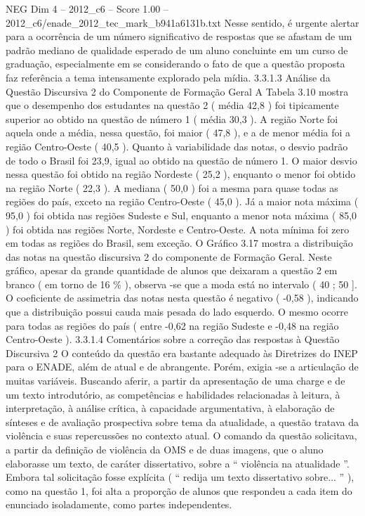 \begin{textsample}{NEG Dim 4 – 2012\_c6 – Score 1.00 – 2012\_c6/enade\_2012\_tec\_mark\_b941a6131b.txt}
Nesse sentido, é urgente alertar para a ocorrência de um número significativo de respostas que se afastam de um padrão mediano de qualidade esperado de um aluno concluinte em um curso de graduação, especialmente em se considerando o fato de que a questão proposta faz referência a tema intensamente explorado pela mídia. 3.3.1.3 Análise da Questão Discursiva 2 do Componente de Formação Geral A Tabela 3.10 mostra que o desempenho dos estudantes na questão 2 ( média 42,8 ) foi tipicamente superior ao obtido na questão de número 1 ( média 30,3 ).
A região Norte foi aquela onde a média, nessa questão, foi maior ( 47,8 ), e a de menor média foi a região Centro-Oeste ( 40,5 ).
Quanto à variabilidade das notas, o desvio padrão de todo o Brasil foi 23,9, igual ao obtido na questão de número 1.
O maior desvio nessa questão foi obtido na região Nordeste ( 25,2 ), enquanto o menor foi obtido na região Norte ( 22,3 ).
A mediana ( 50,0 ) foi a mesma para quase todas as regiões do país, exceto na região Centro-Oeste ( 45,0 ).
Já a maior nota máxima ( 95,0 ) foi obtida nas regiões Sudeste e Sul, enquanto a menor nota máxima ( 85,0 ) foi obtida nas regiões Norte, Nordeste e Centro-Oeste.
A nota mínima foi zero em todas as regiões do Brasil, sem exceção.
O Gráfico 3.17 mostra a distribuição das notas na questão discursiva 2 do componente de Formação Geral.
Neste gráfico, apesar da grande quantidade de alunos que deixaram a questão 2 em branco ( em torno de 16 \% ), observa -se que a moda está no intervalo ( 40 ; 50 ].
O coeficiente de assimetria das notas nesta questão é negativo ( -0,58 ), indicando que a distribuição possui cauda mais pesada do lado esquerdo.
O mesmo ocorre para todas as regiões do país ( entre -0,62 na região Sudeste e -0,48 na região Centro-Oeste ). 3.3.1.4 Comentários sobre a correção das respostas à Questão Discursiva 2 O conteúdo da questão era bastante adequado às Diretrizes do INEP para o ENADE, além de atual e de abrangente.
Porém, exigia -se a articulação de muitas variáveis.
Buscando aferir, a partir da apresentação de uma charge e de um texto introdutório, as competências e habilidades relacionadas à leitura, à interpretação, à análise crítica, à capacidade argumentativa, à elaboração de sínteses e de avaliação prospectiva sobre tema da atualidade, a questão tratava da violência e suas repercussões no contexto atual.
O comando da questão solicitava, a partir da definição de violência da OMS e de duas imagens, que o aluno elaborasse um texto, de caráter dissertativo, sobre a “ violência na atualidade ”.
Embora tal solicitação fosse explícita ( “ redija um texto dissertativo sobre... ” ), como na questão 1, foi alta a proporção de alunos que respondeu a cada item do enunciado isoladamente, como partes independentes.

\end{textsample}
